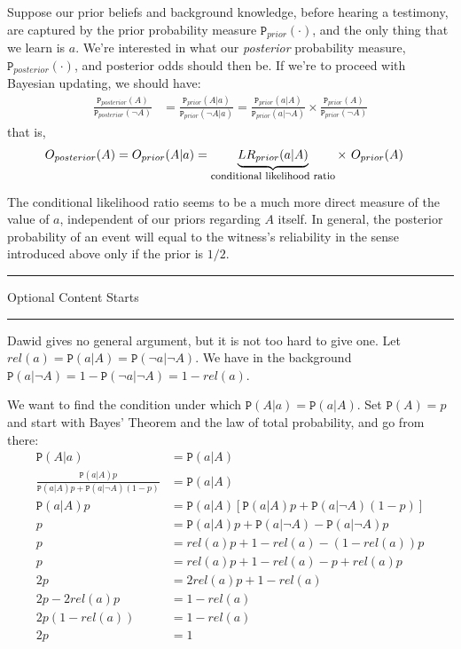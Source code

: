 \documentclass{ifcolog}
\newcommand{\intermezzoa}{
	\begin{minipage}[c]{13cm}
	\begin{center}\rule{10cm}{0.4pt}



	\tiny{\sc Optional Content Starts}
	
	\vspace{-1mm}
	
	\rule{10cm}{0.4pt}\end{center}
	\end{minipage}\nopagebreak 
	}
\newcommand{\pr}[1]{\mbox{$\mathtt{P}(#1)$}}
\newcommand{\prr}[1]{\mbox{$\mathtt{P}_{prior}(#1)$}}
\newcommand{\prp}[1]{\mbox{$\mathtt{P}_{posterior}(#1)$}}
\newcommand{\n}{\neg}
\begin{document}
Suppose our prior beliefs and background knowledge, before hearing a testimony, are captured by the prior probability measure $\prr{\cdot}$, and the only thing that we learn  is $a$. We're interested in what our \emph{posterior} probability measure, $\prp{\cdot}$, and posterior odds should then be. If we're to proceed with Bayesian updating, we should have:
 \begin{align*}
 \frac{\prp{A}}{\prp{\n A}} & = \frac{\prr{A\vert a}}{\prr{\n A\vert a}}
 =
 \frac{\prr{a\vert A}}{\prr{a\vert \n A}}
 \times
 \frac{\prr{A}}{\prr{\n A}}
  \end{align*}
 that is,
 \begin{align}
 \label{bayesodss2}
 O_{posterior}(A)& = O_{prior}(A\vert a) = \underbrace{LR_{prior}(a\vert A)}_{\mbox{\footnotesize conditional likelihood ratio}}\times \,\, O_{prior}(A)
 \end{align}



  The conditional likelihood ratio seems to be a much more direct measure of the value of $a$, independent of our priors regarding $A$ itself.   In general, the posterior probability of an event will equal to the witness's reliability in the sense introduced above only if the prior is $1/2$.


\intermezzoa


   Dawid gives no general argument, but it is not too hard to  give one. Let $rel(a)=\pr{a\vert A}=\pr{\n a\vert \n A}$. We have in the background $\pr{a\vert \n A}=1-\pr{\n a\vert \n A}=1-rel(a)$.



 We want to find the condition under which $\pr{A\vert a} = \pr{a\vert A}$. Set $\pr{A}=p$ and  start with Bayes' Theorem and the law of total probability, and go from there:
 \begin{align*}
 \pr{A\vert a}& = \pr{a\vert A}\\
 \frac{\pr{a\vert A}p}{\pr{a\vert A}p+\pr{a\vert \n A}(1-p)} &= \pr{a\vert A} \\
 \pr{a\vert A}p & = \pr{a\vert A}[\pr{a\vert A}p+\pr{a\vert \n A}(1-p)]\\
 p & = \pr{a\vert A}p + \pr{a\vert \n A} - \pr{a\vert \n A}p\\
 p &= rel(a) p + 1-rel(a)- (1-rel(a))p\\
 p & = rel(a)p +1 - rel(a) -p +rel(a)p \\
 2p & =  2rel(a)p + 1 - rel(a)  \\
 2p - 2 rel(a)p & = 1-rel(a)\\
 2p(1-rel(a)) &= 1-rel(a)\\
 2p & = 1
 \end{align*}
\end{document}
